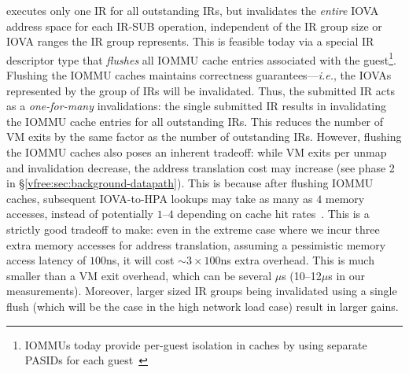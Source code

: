 {\vfreename} executes only one IR for all outstanding IRs, 
    but invalidates the {\em entire} IOVA address space for each IR-SUB operation, 
    independent of the IR group size or IOVA ranges the IR group represents. 
This is feasible today via a special IR descriptor type that 
    {\em flushes} all IOMMU cache entries associated with the guest\footnote{IOMMUs today provide 
        per-guest isolation in caches by using separate PASIDs for each guest~\cite{Zhang2024HDIOV}}. 
%
%
Flushing the IOMMU caches maintains correctness guarantees---\textit{i.e.}, the IOVAs represented by 
    the group of IRs will be invalidated. 
Thus, the submitted IR acts as a {\it one-for-many} invalidations: 
    the single submitted IR results in invalidating the IOMMU cache entries for all outstanding IRs. 
This reduces the number of VM exits by the same factor as the number of outstanding IRs. 
However, flushing the IOMMU caches also poses an inherent tradeoff: 
    while VM exits per unmap and invalidation decrease, the address translation cost may 
    increase (see phase 2 in \S\ref{vfree:sec:background-datapath}). 
This is because after flushing IOMMU caches, subsequent IOVA-to-HPA lookups may take as many as $4$ memory accesses, 
    instead of potentially $1$--$4$ depending on cache hit rates~\cite{Rubin2024FastSafe}. 
This is a strictly good tradeoff to make: even in the extreme case 
    where we incur three extra memory accesses for address translation, 
    assuming a pessimistic memory access latency of $100$ns, 
    it will cost ${\sim}3\times100$ns extra overhead. 
This is much smaller than a VM exit overhead, which can be several $\mu$s (10--12$\mu$s in our measurements).  
Moreover, larger sized IR groups being invalidated using a single flush (which will be the case in the high network load case) result in larger gains. 

